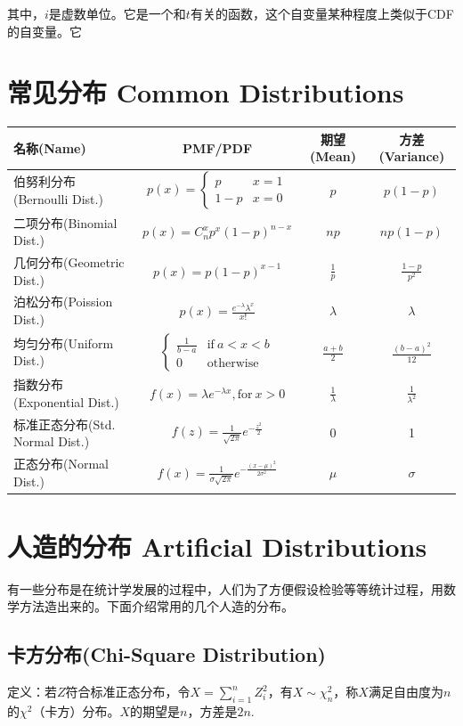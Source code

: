 \documentclass[UTF8]{ctexbook}
\begin{document}
其中，$i$是虚数单位。它是一个和$t$有关的函数，这个自变量某种程度上类似于CDF的自变量。它
\section{常见分布 Common Distributions}
\renewcommand{\arraystretch}{2.1}
\begin{center}
    \begin{tabular}{|l|c|c|c|}
\hline\hline
     名称(Name)&PMF/PDF&期望(Mean)&方差(Variance) \\ \hline
     伯努利分布(Bernoulli Dist.)& $p(x)=\begin{cases} p &x=1 \\ 1-p &x=0 \end{cases}$& $p$& $p(1-p)$ \\ \hline
     二项分布(Binomial Dist.)& $p(x)=C_n^xp^x(1-p)^{n-x}$& $np$& $np(1-p)$ \\ \hline
     几何分布(Geometric Dist.)& $p(x)=p(1-p)^{x-1}$& $\frac{1}{p}$& $\frac{1-p}{p^2}$ \\ \hline
     泊松分布(Poission Dist.)& $p(x)=\frac{e^{-\lambda}\lambda^x}{x!}$& $\lambda$& $\lambda$ \\ \hline
     均匀分布(Uniform Dist.)& $\begin{cases} \frac{1}{b-a} &\text{if}\ a<x<b \\ 0 &\text{otherwise} \end{cases}$& $\frac{a+b}{2}$& $\frac{(b-a)^2}{12}$ \\ \hline
     指数分布(Exponential Dist.)& $f(x)=\lambda e^{-\lambda x}, \text{for}\ x>0$& $\frac{1}{\lambda}$& $\frac{1}{\lambda^2}$ \\ \hline
     标准正态分布(Std. Normal Dist.)& $f(z)=\frac{1}{\sqrt{2\pi}}e^{-\frac{z^2}{2}}$& 0& 1\\ \hline
     正态分布(Normal Dist.)&$f(x)=\frac{1}{\sigma\sqrt{2\pi}}e^{-\frac{(x-\mu)^2}{2\sigma^2}}$& $\mu$& $\sigma$\\ \hline
\hline
\end{tabular}
\end{center}
\renewcommand{\arraystretch}{1}
\section{人造的分布 Artificial Distributions}
有一些分布是在统计学发展的过程中，人们为了方便假设检验等等统计过程，用数学方法造出来的。下面介绍常用的几个人造的分布。
\subsection{卡方分布(Chi-Square Distribution)}
\label{chi-square definition}
定义：若$Z$符合标准正态分布，令$X=\sum_{i=1}^nZ_i^2$，有$X\sim \chi^2_n$，称$X$满足自由度为$n$的$\chi^2$（卡方）分布。$X$的期望是$n$，方差是$2n$.
\end{document}

